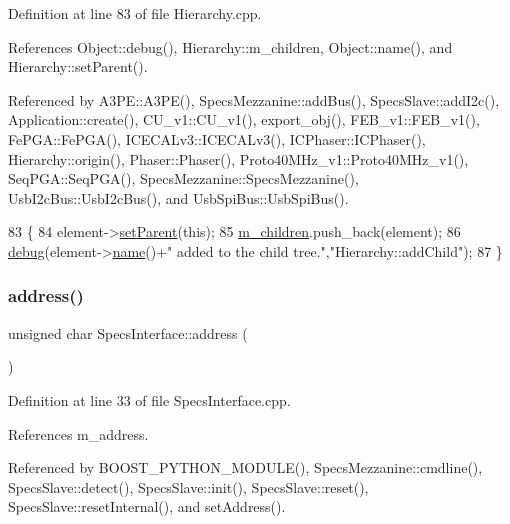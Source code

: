 Definition at line 83 of file Hierarchy.\+cpp.



References Object\+::debug(), Hierarchy\+::m\+\_\+children, Object\+::name(), and Hierarchy\+::set\+Parent().



Referenced by A3\+P\+E\+::\+A3\+P\+E(), Specs\+Mezzanine\+::add\+Bus(), Specs\+Slave\+::add\+I2c(), Application\+::create(), C\+U\+\_\+v1\+::\+C\+U\+\_\+v1(), export\+\_\+obj(), F\+E\+B\+\_\+v1\+::\+F\+E\+B\+\_\+v1(), Fe\+P\+G\+A\+::\+Fe\+P\+G\+A(), I\+C\+E\+C\+A\+Lv3\+::\+I\+C\+E\+C\+A\+Lv3(), I\+C\+Phaser\+::\+I\+C\+Phaser(), Hierarchy\+::origin(), Phaser\+::\+Phaser(), Proto40\+M\+Hz\+\_\+v1\+::\+Proto40\+M\+Hz\+\_\+v1(), Seq\+P\+G\+A\+::\+Seq\+P\+G\+A(), Specs\+Mezzanine\+::\+Specs\+Mezzanine(), Usb\+I2c\+Bus\+::\+Usb\+I2c\+Bus(), and Usb\+Spi\+Bus\+::\+Usb\+Spi\+Bus().


\begin{DoxyCode}
83                                           \{
84   element->\hyperlink{classHierarchy_a585ad1aeec16077a0e532ab8b4fc557b}{setParent}(\textcolor{keyword}{this});
85   \hyperlink{classHierarchy_a038816763941fd4a930504917f60483b}{m\_children}.push\_back(element);
86   \hyperlink{classObject_aac010553f022165573714b7014a15f0d}{debug}(element->\hyperlink{classObject_a300f4c05dd468c7bb8b3c968868443c1}{name}()+\textcolor{stringliteral}{" added to the child tree."},\textcolor{stringliteral}{"Hierarchy::addChild"});
87 \}
\end{DoxyCode}
\mbox{\label{classSpecsInterface_a0fa039a15b842a5ba783ce825b9915d8}} 
\subsubsection{\texorpdfstring{address()}{address()}}
{\footnotesize\ttfamily unsigned char Specs\+Interface\+::address (\begin{DoxyParamCaption}{ }\end{DoxyParamCaption})}



Definition at line 33 of file Specs\+Interface.\+cpp.



References m\+\_\+address.



Referenced by B\+O\+O\+S\+T\+\_\+\+P\+Y\+T\+H\+O\+N\+\_\+\+M\+O\+D\+U\+L\+E(), Specs\+Mezzanine\+::cmdline(), Specs\+Slave\+::detect(), Specs\+Slave\+::init(), Specs\+Slave\+::reset(), Specs\+Slave\+::reset\+Internal(), and set\+Address().


